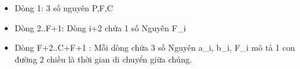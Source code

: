 \begin{itemize}
	\item     Dòng 1: 3 số nguyên P,F,C   
	\item     Dòng 2..F+1: Dòng i+2 chứa 1 số Nguyên F\_i   
	\item     Dòng F+2..C+F+1 : Mỗi dòng chứa 3 số Nguyên a\_i, b\_i, F\_i mô tả 1 con đường 2 chiều là thời gian di chuyển giữa chúng.   
\end{itemize}